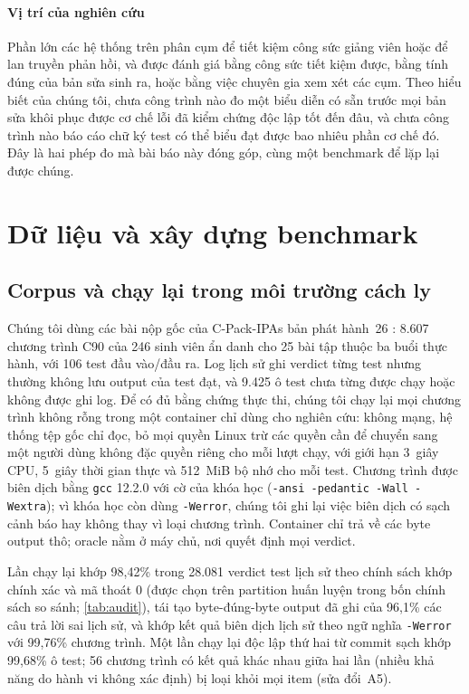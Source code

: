 \documentclass[a4paper,preprint,12pt,authoryear]{elsarticle}
\begin{document}
\paragraph{Vị trí của nghiên cứu}
Phần lớn các hệ thống trên phân cụm để tiết kiệm công sức giảng viên hoặc để lan truyền phản hồi, và được đánh giá bằng công sức tiết kiệm được, bằng tính đúng của bản sửa sinh ra, hoặc bằng việc chuyên gia xem xét các cụm. Theo hiểu biết của chúng tôi, chưa công trình nào đo một biểu diễn có sẵn trước mọi bản sửa khôi phục được cơ chế lỗi đã kiểm chứng độc lập tốt đến đâu, và chưa công trình nào báo cáo chữ ký test có thể biểu đạt được bao nhiêu phần cơ chế đó. Đây là hai phép đo mà bài báo này đóng góp, cùng một benchmark để lặp lại được chúng.

\section{Dữ liệu và xây dựng benchmark}\label{sec:data}

\subsection{Corpus và chạy lại trong môi trường cách ly}\label{sec:replay}
Chúng tôi dùng các bài nộp gốc của C-Pack-IPAs bản phát hành~26 \citep{orvalho2024cpack}: 8.607 chương trình C90 của 246 sinh viên ẩn danh cho 25 bài tập thuộc ba buổi thực hành, với 106 test đầu vào/đầu ra. Log lịch sử ghi verdict từng test nhưng thường không lưu output của test đạt, và 9.425 ô test chưa từng được chạy hoặc không được ghi log. Để có đủ bằng chứng thực thi, chúng tôi chạy lại mọi chương trình không rỗng trong một container chỉ dùng cho nghiên cứu: không mạng, hệ thống tệp gốc chỉ đọc, bỏ mọi quyền Linux trừ các quyền cần để chuyển sang một người dùng không đặc quyền riêng cho mỗi lượt chạy, với giới hạn 3~giây CPU, 5~giây thời gian thực và 512~MiB bộ nhớ cho mỗi test. Chương trình được biên dịch bằng \texttt{gcc} 12.2.0 với cờ của khóa học (\texttt{-ansi -pedantic -Wall -Wextra}); vì khóa học còn dùng \texttt{-Werror}, chúng tôi ghi lại việc biên dịch có sạch cảnh báo hay không thay vì loại chương trình. Container chỉ trả về các byte output thô; oracle nằm ở máy chủ, nơi quyết định mọi verdict.

Lần chạy lại khớp 98,42\% trong 28.081 verdict test lịch sử theo chính sách khớp chính xác và mã thoát 0 (được chọn trên partition huấn luyện trong bốn chính sách so sánh; \cref{tab:audit}), tái tạo byte-đúng-byte output đã ghi của 96,1\% các câu trả lời sai lịch sử, và khớp kết quả biên dịch lịch sử theo ngữ nghĩa \texttt{-Werror} với 99,76\% chương trình. Một lần chạy lại độc lập thứ hai từ commit sạch khớp 99,68\% ô test; 56 chương trình có kết quả khác nhau giữa hai lần (nhiều khả năng do hành vi không xác định) bị loại khỏi mọi item (sửa đổi~A5).
\end{document}

